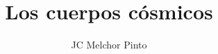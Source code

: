 \documentclass[12pt,addpoints,answers]{guia}
\title{Los cuerpos cósmicos}
\author{JC Melchor Pinto}
\begin{document}
\INFO%
\begin{questions}
    \questionboxed[25]{}
    \questionboxed[25]{}
\end{questions}
\end{document}
